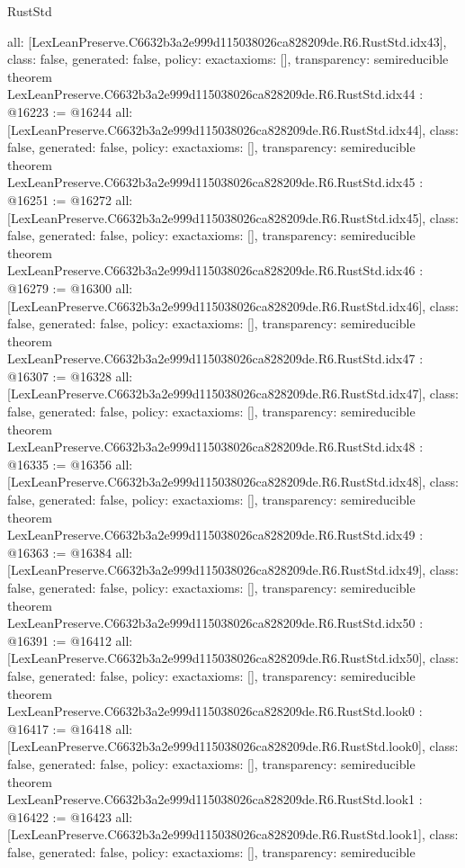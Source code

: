 \begin{lexlean}{RustStd}
\begin{coremodule}
{  all: [LexLeanPreserve.C6632b3a2e999d115038026ca828209de.R6.RustStd.idx43],
  class: false,
  generated: false,
  policy: exact{axioms: []},
  transparency: semireducible
}
theorem LexLeanPreserve.C6632b3a2e999d115038026ca828209de.R6.RustStd.idx44 : @16223 := @16244 {
  all: [LexLeanPreserve.C6632b3a2e999d115038026ca828209de.R6.RustStd.idx44],
  class: false,
  generated: false,
  policy: exact{axioms: []},
  transparency: semireducible
}
theorem LexLeanPreserve.C6632b3a2e999d115038026ca828209de.R6.RustStd.idx45 : @16251 := @16272 {
  all: [LexLeanPreserve.C6632b3a2e999d115038026ca828209de.R6.RustStd.idx45],
  class: false,
  generated: false,
  policy: exact{axioms: []},
  transparency: semireducible
}
theorem LexLeanPreserve.C6632b3a2e999d115038026ca828209de.R6.RustStd.idx46 : @16279 := @16300 {
  all: [LexLeanPreserve.C6632b3a2e999d115038026ca828209de.R6.RustStd.idx46],
  class: false,
  generated: false,
  policy: exact{axioms: []},
  transparency: semireducible
}
theorem LexLeanPreserve.C6632b3a2e999d115038026ca828209de.R6.RustStd.idx47 : @16307 := @16328 {
  all: [LexLeanPreserve.C6632b3a2e999d115038026ca828209de.R6.RustStd.idx47],
  class: false,
  generated: false,
  policy: exact{axioms: []},
  transparency: semireducible
}
theorem LexLeanPreserve.C6632b3a2e999d115038026ca828209de.R6.RustStd.idx48 : @16335 := @16356 {
  all: [LexLeanPreserve.C6632b3a2e999d115038026ca828209de.R6.RustStd.idx48],
  class: false,
  generated: false,
  policy: exact{axioms: []},
  transparency: semireducible
}
theorem LexLeanPreserve.C6632b3a2e999d115038026ca828209de.R6.RustStd.idx49 : @16363 := @16384 {
  all: [LexLeanPreserve.C6632b3a2e999d115038026ca828209de.R6.RustStd.idx49],
  class: false,
  generated: false,
  policy: exact{axioms: []},
  transparency: semireducible
}
theorem LexLeanPreserve.C6632b3a2e999d115038026ca828209de.R6.RustStd.idx50 : @16391 := @16412 {
  all: [LexLeanPreserve.C6632b3a2e999d115038026ca828209de.R6.RustStd.idx50],
  class: false,
  generated: false,
  policy: exact{axioms: []},
  transparency: semireducible
}
theorem LexLeanPreserve.C6632b3a2e999d115038026ca828209de.R6.RustStd.look0 : @16417 := @16418 {
  all: [LexLeanPreserve.C6632b3a2e999d115038026ca828209de.R6.RustStd.look0],
  class: false,
  generated: false,
  policy: exact{axioms: []},
  transparency: semireducible
}
theorem LexLeanPreserve.C6632b3a2e999d115038026ca828209de.R6.RustStd.look1 : @16422 := @16423 {
  all: [LexLeanPreserve.C6632b3a2e999d115038026ca828209de.R6.RustStd.look1],
  class: false,
  generated: false,
  policy: exact{axioms: []},
  transparency: semireducible
}
\end{coremodule}
\end{lexlean}
